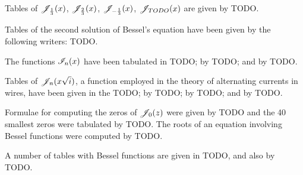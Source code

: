 \documentclass{book}
\begin{document}
Tables of $\mathscr{J}_{\frac{1}{3}}(x)$, $\mathscr{J}_{\frac{2}{3}}(x)$,
$\mathscr{J}_{-\frac{1}{3}}(x)$, $\mathscr{J}_{TODO}(x)$ are given by TODO.

Tables of the second solution of Bessel's equation have been given by
the following writers: TODO.

The functions $\mathscr{I}_n(x)$ have been tabulated in TODO; by TODO; and
by TODO.

Tables of $\mathscr{J}_n(x \sqrt{i})$, a function employed in the theory of
alternating currents in wires, have been given in the TODO; by TODO;
by TODO; and by TODO.

Formulae for computing the zeros of $\mathscr{J}_0(z)$ were given by TODO
and the 40 smallest zeros were tabulated by TODO. The roots of an
equation involving Bessel functions were computed by TODO.

A number of tables with Bessel functions are given in TODO, and also
by TODO.
\end{document}
